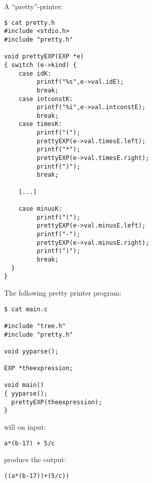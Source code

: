 \begin{slide*}
A ``pretty''-printer:

\begin{scriptsize}
\begin{verbatim}
$ cat pretty.h
#include <stdio.h>
#include "pretty.h"

void prettyEXP(EXP *e)
{ switch (e->kind) {
    case idK:
         printf("%s",e->val.idE);
         break;
    case intconstK:
         printf("%i",e->val.intconstE);
         break;
    case timesK:
         printf("(");
         prettyEXP(e->val.timesE.left);
         printf("*");
         prettyEXP(e->val.timesE.right);
         printf(")");
         break;

    [...]

    case minusK:
         printf("(");
         prettyEXP(e->val.minusE.left);
         printf("-");
         prettyEXP(e->val.minusE.right);
         printf(")");
         break;
  }
}
\end{verbatim}
\end{scriptsize}
\vfil
\end{slide*}

\begin{slide*}
The following pretty printer program:

\begin{scriptsize}
\begin{verbatim}
$ cat main.c

#include "tree.h"
#include "pretty.h"
 
void yyparse();
 
EXP *theexpression;
 
void main()
{ yyparse();
  prettyEXP(theexpression);
}
\end{verbatim}
\end{scriptsize}

will on input:

\begin{scriptsize}
\begin{verbatim}
a*(b-17) + 5/c
\end{verbatim}
\end{scriptsize}

produce the output:

\begin{scriptsize}
\begin{verbatim}
((a*(b-17))+(5/c))
\end{verbatim}
\end{scriptsize}
\vfil
\end{slide*}

